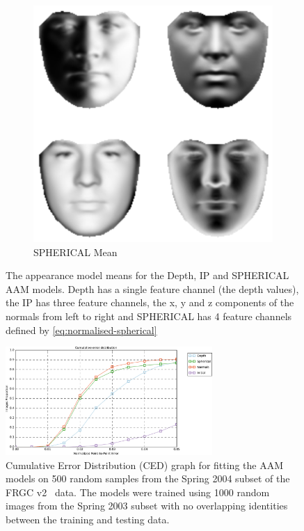 \begin{figure}[t]
\begin{subfigure}[b]{0.25\textwidth}
        \includegraphics[width=\textwidth]{statistical_normals/images/lk2d/spherical_aam_mean.png}
        \caption{SPHERICAL Mean}\label{subfig:singl_img_spherical_aam_mean}
    \end{subfigure}
    \hspace*{\fill}
    \caption{The appearance model means for the Depth, IP and SPHERICAL
             AAM models.
             Depth has a single feature channel (the depth values),
             the IP has three feature channels, the x, y and z components of
             the normals from left to right and SPHERICAL has 4 feature channels
             defined by \cref{eq:normalised-spherical}}
\label{fig:single_img_2d_aam_means}
\end{figure}
\begin{figure}[t]
    \centering
    \includegraphics[width=0.7\textwidth]{statistical_normals/images/lk2d/aam_fgrc_500_random}
    \caption{Cumulative Error Distribution (CED) graph for fitting the AAM
             models on 500 random samples from the Spring 2004 subset of the
             FRGC v2~\cite{phillips2005overview} data. The models were trained
             using 1000 random images from the Spring 2003 subset with no
             overlapping identities between the training and testing data.}
\label{fig:single_img_aam_results}
\end{figure}
